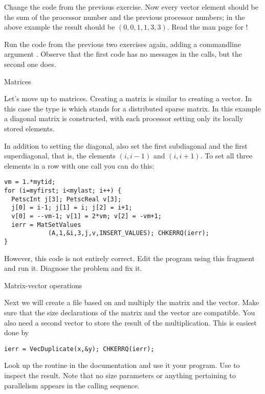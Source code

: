 \begin{exercise}
  Change the code from the previous exercise. Now every vector element
  should be the sum of the processor number and the previous
  processor numbers; in the above example the result should be
  $(0,0,1,1,3,3)$. Read the man page for !
\end{exercise}

Run the code from the previous two exercises again, adding a
commandline argument . Observe that the first code has
no messages in the  calls, but the second one
does.

 {Matrices}

Let's move up to matrices. Creating a matrix is similar to creating a
vector. In this case the type is  which stands for a
distributed sparse matrix.
In this example a diagonal matrix is constructed, with each processor
setting only its locally stored elements.

\begin{exercise}
  In addition to setting the diagonal, also set the first
  subdiagonal and the first superdiagonal, that is, the elements
  $(i,i-1)$ and $(i,i+1)$. To set all three elements in a row with one
  call you can do this:
\begin{verbatim}
vm = 1.*mytid;
for (i=myfirst; i<mylast; i++) {
  PetscInt j[3]; PetscReal v[3];
  j[0] = i-1; j[1] = i; j[2] = i+1;
  v[0] = --vm-1; v[1] = 2*vm; v[2] = -vm+1;
  ierr = MatSetValues
            (A,1,&i,3,j,v,INSERT_VALUES); CHKERRQ(ierr);
}
\end{verbatim}
However, this code is not entirely correct. Edit the program using
this fragment and run it. Diagnose the problem and fix it.
\end{exercise}

 {Matrix-vector operations}

Next we will create a file  based on  and multiply the
matrix and the vector. Make sure that the size declarations
of the matrix and the vector are compatible. You also need a second
vector to store the result of the multiplication. This is easiest done
by
\begin{verbatim}
ierr = VecDuplicate(x,&y); CHKERRQ(ierr);
\end{verbatim}

\begin{exercise}
  Look up the  routine in the documentation and use it your
  program. Use  to inspect the result. Note that no size
  parameters or anything pertaining to parallelism appears in the
  calling sequence.
\end{exercise}


